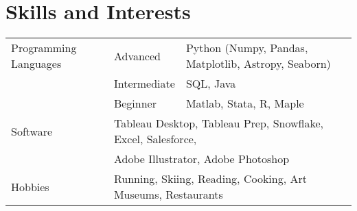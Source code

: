 \documentclass[a4paper,12pt]{article}
\begin{document}
\section{Skills and Interests}
\begin{tabularx}{\linewidth}{@{}l l X@{}}
Programming Languages & Advanced & \normalsize{Python (Numpy, Pandas, Matplotlib, Astropy, Seaborn)}\\
 & Intermediate & \normalsize{SQL, Java}\\
 & Beginner & \normalsize{Matlab, Stata, R, Maple}\\
Software & \multicolumn{2}{l}{\normalsize{Tableau Desktop, Tableau Prep, Snowflake, Excel, Salesforce, }}\\
& \multicolumn{2}{l}{\normalsize{Adobe Illustrator, Adobe Photoshop}}\\
Hobbies & \multicolumn{2}{l}{\normalsize{Running, Skiing, Reading, Cooking, Art Museums, Restaurants}}\\

\end{tabularx}

\vfill
{}
\end{document}
